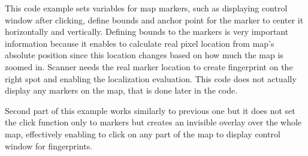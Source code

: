 This code example sets variables for map markers, such as displaying control window after clicking, define bounds and anchor point for the marker to center it horizontally and vertically. Defining bounds to the markers is very important information because it enables to calculate real pixel location from map's absolute position since this location changes based on how much the map is zoomed in. Scanner needs the real marker location to create fingerprint on the right spot and enabling the localization evaluation. This code does not actually display any markers on the map, that is done later in the code.

Second part of this example works similarly to previous one but it does not set the click function only to markers but creates an invisible overlay over the whole map, effectively enabling to click on any part of the map to display control window for fingerprints.